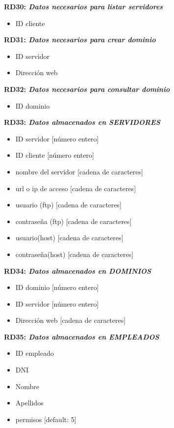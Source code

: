 \documentclass[paper=a4, fontsize=11pt, spanish]{scrartcl}
\begin{document}
\setlength{\parindent}{0em}
\textbf{RD30: \textit{Datos necesarios para listar servidores}}
\setlength{\parindent}{2em}
\begin{itemize}
  \item ID cliente
\end{itemize}

\setlength{\parindent}{0em}
\textbf{RD31: \textit{Datos necesarios para crear dominio}}
\setlength{\parindent}{2em}
\begin{itemize}
  \item ID servidor 
  \item Dirección web
\end{itemize}

\setlength{\parindent}{0em}
\textbf{RD32: \textit{Datos necesarios para consultar dominio}}
\setlength{\parindent}{2em}
\begin{itemize}
  \item ID dominio
\end{itemize}

\setlength{\parindent}{0em}
\textbf{RD33: \textit{Datos almacenados en SERVIDORES}}
\setlength{\parindent}{2em}
\begin{itemize}
  \item ID servidor [número entero]
  \item ID cliente [número entero]
  \item nombre del servidor [cadena de caracteres]
  \item url o ip de acceso [cadena de caracteres]
  \item usuario (ftp) [cadena de caracteres]
  \item contraseña (ftp) [cadena de caracteres]
  \item usuario(host) [cadena de caracteres]
  \item contraseña(host) [cadena de caracteres]
\end{itemize}

\setlength{\parindent}{0em}
\textbf{RD34: \textit{Datos almacenados en DOMINIOS}}
\setlength{\parindent}{2em}
\begin{itemize}
  \item ID dominio [número entero]
  \item ID servidor [número entero]
  \item Dirección web [cadena de caracteres]
\end{itemize}

\setlength{\parindent}{0em}
\textbf{RD35: \textit{Datos almacenados en EMPLEADOS}}
\setlength{\parindent}{2em}
\begin{itemize}
  \item ID empleado
  \item DNI
  \item Nombre
  \item Apellidos
  \item permisos [default: 5]
\end{itemize}
\end{document}
